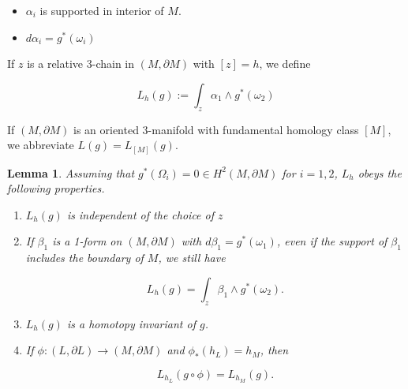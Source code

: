 \documentclass{amsart}
\newtheorem*{theorem 1}{Theorem 1}
\newtheorem*{theorem 2}{Theorem 2}
\newtheorem*{theorem 3}{Theorem 3}
\newtheorem{lemma}{Lemma}[section]
\numberwithin{equation}{section}
\begin{document}
\begin{itemize}

\item $\alpha_i$ is supported in interior of $M$.

\item $d \alpha_i = g^*(\omega_i)$

\end{itemize}

If $z$ is a relative 3-chain in $(M, \partial M)$ with $[z] = h$,  we define

\begin{equation} \label{defL}
L_h(g) := \int_z \alpha_1 \wedge g^*(\omega_2)
\end{equation}

If $(M,  \partial M)$ is an oriented 3-manifold with fundamental homology class $[M]$, we abbreviate $L(g) = L_{[M]}(g)$.  

\begin{lemma} \label{lemmalink} Assuming that $g^*(\Omega_i) = 0 \in H^2(M, \partial M)$ for $i = 1, 2$,  $L_h$ obeys the following properties.

\begin{enumerate}


\item $L_h(g)$ is independent of the choice of $z$

\item If $\beta_1$ is a 1-form on $(M, \partial M)$ with $d \beta_1 = g^*(\omega_1)$,  even if the support of $\beta_1$ includes the boundary of $M$,  we still have

$$ L_h(g) = \int_z \beta_1 \wedge g^*(\omega_2). $$

\item $L_h(g)$ is a homotopy invariant of $g$. 

\item If $\phi: (L, \partial L) \rightarrow (M, \partial M)$ and $\phi_*(h_L) = h_M$,  then

$$ L_{h_L}(g \circ \phi) = L_{h_M} (g).  $$

\end{enumerate}

\end{lemma}
\end{document}
